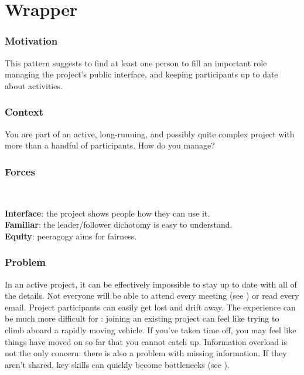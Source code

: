 
\section{Wrapper}\label{sec:Wrapper}
\subsubsection*{Motivation} This pattern suggests to find at least one person to fill an important role managing the project's public interface, and keeping participants up to date about activities.



\subsubsection*{Context} You are part of an active, long-running, and possibly quite complex project with more than a handful of participants.  How do you manage?

\subsubsection*{Forces}~
\parbox[t]{.85\textwidth}{
\textbf{Interface}: the project shows people how they can use it.\\
\textbf{Familiar}: the leader/follower dichotomy is easy to understand.\\
\textbf{Equity}: peeragogy aims for fairness.\\
}

\subsubsection*{Problem} In an active project, it can be effectively impossible to stay up to date with all of the details.  Not everyone will be able to attend every meeting (see ) or read every email.  Project participants can easily get lost and drift away.  The experience can be much more difficult for : joining an existing project can feel like trying to climb aboard a rapidly moving vehicle.  If you've taken time off, you may feel like things have moved on so far that you cannot catch up.  Information overload is not the only concern: there is also a problem with missing information.  If they aren't shared, key skills can quickly become bottlenecks (see ).

